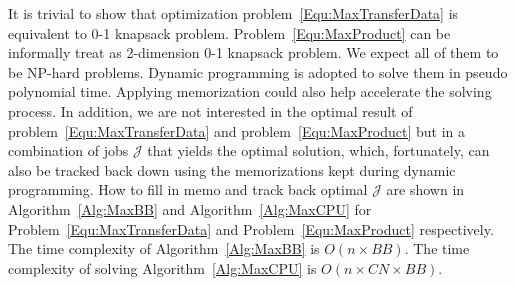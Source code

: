 It is trivial to show that optimization problem~\ref{Equ:MaxTransferData}
is equivalent to 0-1 knapsack problem.
Problem~\ref{Equ:MaxProduct} can be informally treat as 2-dimension 0-1 knapsack problem.
We expect all of them to be NP-hard problems.
Dynamic programming is adopted to solve them in pseudo polynomial time.
Applying memorization could also help accelerate the solving process.
In addition, we are not interested in the optimal result of
problem~\ref{Equ:MaxTransferData} and problem~\ref{Equ:MaxProduct}
but in a combination of jobs $\mathcal{J}$ that yields the optimal solution,
which, fortunately, can also be tracked back down
using the memorizations kept during dynamic programming.
How to fill in memo and track back optimal $\mathcal{J}$ are shown in Algorithm~\ref{Alg:MaxBB}
and Algorithm~\ref{Alg:MaxCPU} for Problem~\ref{Equ:MaxTransferData}
and Problem~\ref{Equ:MaxProduct} respectively.
The time complexity of Algorithm~\ref{Alg:MaxBB} is $O(n\times BB)$.
The time complexity of solving Algorithm~\ref{Alg:MaxCPU} is $O(n\times CN\times BB)$.


